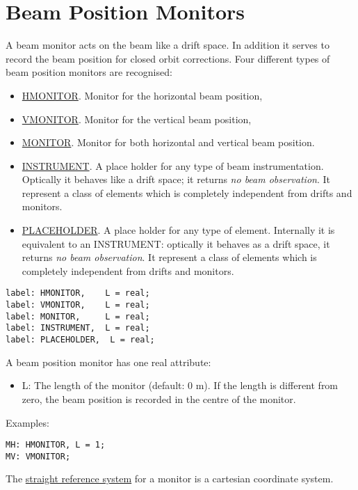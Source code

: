 
\section{Beam Position Monitors}
\label{sec:monitors}

A beam monitor acts on the beam like a drift space. In addition it
serves to record the beam position for closed orbit corrections. Four
different types of beam position monitors are recognised:  

\begin{itemize}
   \item \href{hmon}{HMONITOR}. Monitor for the horizontal beam position, 
   \item \href{vmon}{VMONITOR}. Monitor for the vertical beam position, 
   \item \href{mon}{MONITOR}. Monitor for both horizontal and vertical beam position. 
   \item \href{inst}{INSTRUMENT}. A place holder for any type of beam
     instrumentation. Optically it behaves like a drift space; it
     returns \emph{no beam observation}. It represent a class of
     elements which is completely independent from drifts and monitors.  
   \item \href{plac}{PLACEHOLDER}. A place holder for any type of
     element. Internally it is equivalent to an INSTRUMENT: optically it
     behaves as a drift space, it returns \emph{no beam observation}. It
     represent a class of elements which is completely independent from
     drifts and monitors. 
\end{itemize}

\begin{verbatim}
label: HMONITOR,    L = real;
label: VMONITOR,    L = real;
label: MONITOR,     L = real;
label: INSTRUMENT,  L = real;
label: PLACEHOLDER,  L = real;
\end{verbatim} 

A beam position monitor has one real attribute: 
\begin{itemize}
   \item L: The length of the monitor (default: 0 m). If the length is
     different from zero, the beam position is recorded in the centre of
     the monitor.  
\end{itemize} 

Examples: 
\begin{verbatim}
MH: HMONITOR, L = 1;
MV: VMONITOR;
\end{verbatim} 

The \href{local_system.html#straight}{straight reference system} for a
monitor is a cartesian coordinate system.  


